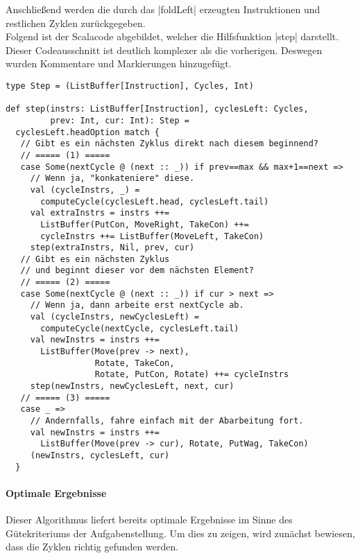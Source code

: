 Anschließend werden die durch das |foldLeft| erzeugten Instruktionen und restlichen Zyklen zurück\-ge\-ge\-ben.\\
Folgend ist der Scalacode abgebildet, welcher die Hilfsfunktion |step| darstellt.
Dieser Codeausschnitt ist deutlich komplexer als die vorherigen. Deswegen wurden Kommentare und Markierungen hinzugefügt.
\lstset{basicstyle=\ttfamily\small}
\begin{lstlisting}
type Step = (ListBuffer[Instruction], Cycles, Int)

def step(instrs: ListBuffer[Instruction], cyclesLeft: Cycles,
         prev: Int, cur: Int): Step =
  cyclesLeft.headOption match {
   // Gibt es ein nächsten Zyklus direkt nach diesem beginnend?
   // ===== (1) =====
   case Some(nextCycle @ (next :: _)) if prev==max && max+1==next =>
     // Wenn ja, "konkateniere" diese.
     val (cycleInstrs, _) =
       computeCycle(cyclesLeft.head, cyclesLeft.tail)
     val extraInstrs = instrs ++=
       ListBuffer(PutCon, MoveRight, TakeCon) ++=
       cycleInstrs ++= ListBuffer(MoveLeft, TakeCon)
     step(extraInstrs, Nil, prev, cur)
   // Gibt es ein nächsten Zyklus
   // und beginnt dieser vor dem nächsten Element?
   // ===== (2) =====
   case Some(nextCycle @ (next :: _)) if cur > next =>
     // Wenn ja, dann arbeite erst nextCycle ab.
     val (cycleInstrs, newCyclesLeft) =
       computeCycle(nextCycle, cyclesLeft.tail)
     val newInstrs = instrs ++=
       ListBuffer(Move(prev -> next),
                  Rotate, TakeCon,
                  Rotate, PutCon, Rotate) ++= cycleInstrs
     step(newInstrs, newCyclesLeft, next, cur)
   // ===== (3) =====
   case _ =>
     // Andernfalls, fahre einfach mit der Abarbeitung fort.
     val newInstrs = instrs ++=
       ListBuffer(Move(prev -> cur), Rotate, PutWag, TakeCon)
     (newInstrs, cyclesLeft, cur)
  }
\end{lstlisting}
\lstset{basicstyle=\ttfamily\normalsize}

\paragraph{Optimale Ergebnisse}
\label{opt_res}
Dieser Algorithmus liefert bereits optimale Ergebnisse im Sinne des Güte\-kri\-ter\-iums der Aufgabenstellung.
Um dies zu zeigen, wird zunächst bewiesen, dass die Zyklen richtig gefunden werden. \\

